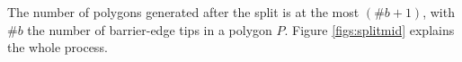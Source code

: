 The number of polygons generated after the split is at the most $(\#b + 1)$, with $\#b$ the number of barrier-edge tips in a polygon $P$. Figure \ref{figs:splitmid} explains the whole process.















